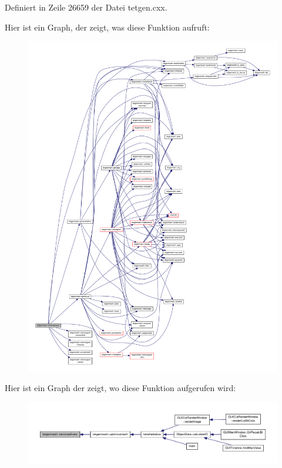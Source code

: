 Definiert in Zeile 26659 der Datei tetgen.\-cxx.



Hier ist ein Graph, der zeigt, was diese Funktion aufruft\-:\nopagebreak
\begin{figure}[H]
\begin{center}
\leavevmode
\includegraphics[width=350pt]{classtetgenmesh_ad5c46c2f6c9adeed23fc8c64b682778d_cgraph}
\end{center}
\end{figure}




Hier ist ein Graph der zeigt, wo diese Funktion aufgerufen wird\-:\nopagebreak
\begin{figure}[H]
\begin{center}
\leavevmode
\includegraphics[width=350pt]{classtetgenmesh_ad5c46c2f6c9adeed23fc8c64b682778d_icgraph}
\end{center}
\end{figure}



